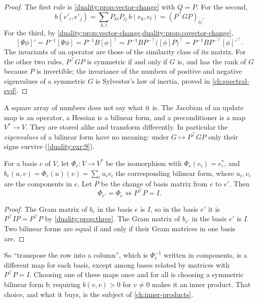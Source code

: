 \begin{notechapter}
\begin{proof}
The first rule is \cref{duality:prop:vector-change} with $Q = P$. For the
second,
\[
  b(e'_i, e'_j) = \sum_{k,l}P_{ki}P_{lj}\,b(e_k, e_l) = (P^\top GP)_{ij} .
\]
For the third, by
\cref{duality:prop:vector-change,duality:prop:covector-change},
\[
  [\Psi\phi]' = P^{-1}[\Psi\phi] = P^{-1}B[\phi]^\top
  = P^{-1}BP^{-\top}\bigl([\phi]P\bigr)^\top
  = P^{-1}BP^{-\top}[\phi]'^\top .
\]
The invariants of an operator are those of the similarity class of its
matrix. For the other two rules, $P^\top GP$ is symmetric if and only if
$G$ is, and has the rank of $G$ because $P$ is invertible; the invariance
of the numbers of positive and negative eigenvalues of a symmetric $G$ is
Sylvester's law of inertia, proved in \cref{ch:spectral-svd}.
\end{proof}

\begin{keyidea}
A square array of numbers does not say what it is. The Jacobian of an
update map is an operator, a Hessian is a bilinear form, and a
preconditioner is a map $V^*\to V$. They are stored alike and transform
differently. In particular the \emph{eigenvalues} of a bilinear form have
no meaning: under $G\mapsto P^\top GP$ only their signs survive
(\cref{duality:exr:9}).
\end{keyidea}

\begin{proposition}
\label{duality:prop:identification}
For a basis $e$ of $V$, let $\Phi_e:V\to V^*$ be the isomorphism with
$\Phi_e(e_i) = e_i^*$, and $b_e(u, v) = \Phi_e(u)(v) = \sum_iu_iv_i$ the
corresponding bilinear form, where $u_i, v_i$ are the components in $e$.
Let $P$ be the change of basis matrix from $e$ to $e'$. Then
\[
  \Phi_{e'} = \Phi_e \iff P^\top P = I .
\]
\end{proposition}

\begin{proof}
The Gram matrix of $b_e$ in the basis $e$ is $I$, so in the basis $e'$ it
is $P^\top IP = P^\top P$ by \cref{duality:prop:three}. The Gram matrix of
$b_{e'}$ in the basis $e'$ is $I$. Two bilinear forms are equal if and
only if their Gram matrices in one basis are.
\end{proof}

So ``transpose the row into a column'', which is $\Phi_e^{-1}$ written in
components, is a different map for each basis, except among bases related
by matrices with $P^\top P = I$. Choosing one of these maps once and for
all is choosing a symmetric bilinear form $b$; requiring $b(v, v) > 0$ for
$v\neq0$ makes it an inner product. That choice, and what it buys, is the
subject of \cref{ch:inner-products}.


\end{notechapter}
